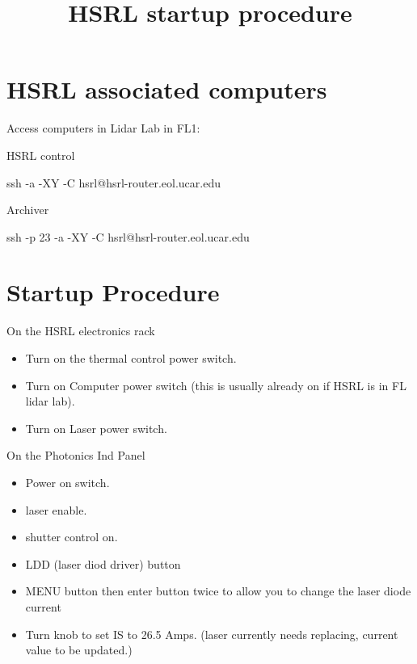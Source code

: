 \documentclass[a4paper,12pt]{report}
\begin{document}
\title{HSRL startup procedure}
\maketitle

\newpage

\section{HSRL associated computers}

Access computers in Lidar Lab in FL1: 

HSRL control 

  ssh -a -XY -C hsrl@hsrl-router.eol.ucar.edu

Archiver 

  ssh -p 23 -a -XY -C hsrl@hsrl-router.eol.ucar.edu

\section{Startup Procedure}

On the HSRL electronics rack

\begin{itemize}

\item Turn on the thermal control power switch. 

\item Turn on Computer power switch (this is usually already on if HSRL is in FL lidar lab). 

\item Turn on Laser power switch. 

\end{itemize}

\noindent On the Photonics Ind Panel

\begin{itemize}

\item Power on switch. 

\item laser enable. 

\item shutter control on. 

\item LDD (laser diod driver) button 

\item MENU button then enter button twice to allow you to change the laser diode current 

\item Turn knob to set IS to 26.5 Amps. (laser currently needs replacing, current value to be updated.) 

\end{itemize}
\end{document}
